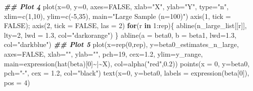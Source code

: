\documentclass[
  14pt,
]{memoir}
\newenvironment{Shaded}{\begin{snugshade}}{\end{snugshade}}
\newcommand{\AttributeTok}[1]{\textcolor[rgb]{0.77,0.63,0.00}{#1}}
\newcommand{\ConstantTok}[1]{\textcolor[rgb]{0.00,0.00,0.00}{#1}}
\newcommand{\ControlFlowTok}[1]{\textcolor[rgb]{0.13,0.29,0.53}{\textbf{#1}}}
\newcommand{\DecValTok}[1]{\textcolor[rgb]{0.00,0.00,0.81}{#1}}
\newcommand{\DocumentationTok}[1]{\textcolor[rgb]{0.56,0.35,0.01}{\textbf{\textit{#1}}}}
\newcommand{\FloatTok}[1]{\textcolor[rgb]{0.00,0.00,0.81}{#1}}
\newcommand{\FunctionTok}[1]{\textcolor[rgb]{0.00,0.00,0.00}{#1}}
\newcommand{\NormalTok}[1]{#1}
\newcommand{\SpecialCharTok}[1]{\textcolor[rgb]{0.00,0.00,0.00}{#1}}
\newcommand{\StringTok}[1]{\textcolor[rgb]{0.31,0.60,0.02}{#1}}
\begin{document}
\begin{Shaded}
\begin{Highlighting}[]
\DocumentationTok{\#\# Plot 4}
\FunctionTok{plot}\NormalTok{(}\AttributeTok{x=}\DecValTok{0}\NormalTok{, }\AttributeTok{y=}\DecValTok{0}\NormalTok{, }\AttributeTok{axes=}\ConstantTok{FALSE}\NormalTok{, }\AttributeTok{xlab=}\StringTok{"X"}\NormalTok{, }\AttributeTok{ylab=}\StringTok{"Y"}\NormalTok{, }\AttributeTok{type=}\StringTok{"n"}\NormalTok{,}
     \AttributeTok{xlim=}\FunctionTok{c}\NormalTok{(}\DecValTok{1}\NormalTok{,}\DecValTok{10}\NormalTok{), }\AttributeTok{ylim=}\FunctionTok{c}\NormalTok{(}\SpecialCharTok{{-}}\DecValTok{5}\NormalTok{,}\DecValTok{35}\NormalTok{), }\AttributeTok{main=}\StringTok{"Large Sample (n=100)"}\NormalTok{)}
\FunctionTok{axis}\NormalTok{(}\DecValTok{1}\NormalTok{, }\AttributeTok{tick =} \ConstantTok{FALSE}\NormalTok{); }\FunctionTok{axis}\NormalTok{(}\DecValTok{2}\NormalTok{, }\AttributeTok{tick =} \ConstantTok{FALSE}\NormalTok{, }\AttributeTok{las =} \DecValTok{2}\NormalTok{)}
\ControlFlowTok{for}\NormalTok{(r }\ControlFlowTok{in} \DecValTok{1}\SpecialCharTok{:}\NormalTok{rep)\{}
\FunctionTok{abline}\NormalTok{(n\_large\_list[[r]], }\AttributeTok{lty=}\DecValTok{2}\NormalTok{, }\AttributeTok{lwd =} \FloatTok{1.3}\NormalTok{, }\AttributeTok{col=}\StringTok{"darkorange"}\NormalTok{)}
\NormalTok{\}}
\FunctionTok{abline}\NormalTok{(}\AttributeTok{a =}\NormalTok{ beta0, }\AttributeTok{b =}\NormalTok{ beta1, }\AttributeTok{lwd=}\FloatTok{1.3}\NormalTok{, }\AttributeTok{col=}\StringTok{"darkblue"}\NormalTok{)}
\DocumentationTok{\#\# Plot 5}
\FunctionTok{plot}\NormalTok{(}\AttributeTok{x=}\FunctionTok{rep}\NormalTok{(}\DecValTok{0}\NormalTok{,rep), }\AttributeTok{y=}\NormalTok{beta0\_estimates\_n\_large, }\AttributeTok{axes=}\ConstantTok{FALSE}\NormalTok{, }
     \AttributeTok{xlab=}\StringTok{""}\NormalTok{, }\AttributeTok{ylab=}\StringTok{""}\NormalTok{, }\AttributeTok{pch=}\DecValTok{19}\NormalTok{, }\AttributeTok{cex=}\FloatTok{1.2}\NormalTok{, }\AttributeTok{ylim=}\NormalTok{y\_range,}
  \AttributeTok{main=}\FunctionTok{expression}\NormalTok{(}\FunctionTok{hat}\NormalTok{(beta)[}\DecValTok{0}\NormalTok{]}\SpecialCharTok{\textasciitilde{}}\StringTok{\textquotesingle{}|\textquotesingle{}}\SpecialCharTok{\textasciitilde{}}\NormalTok{X), }\AttributeTok{col=}\FunctionTok{alpha}\NormalTok{(}\StringTok{"red"}\NormalTok{,}\FloatTok{0.2}\NormalTok{))}
\FunctionTok{points}\NormalTok{(}\AttributeTok{x =} \DecValTok{0}\NormalTok{, }\AttributeTok{y=}\NormalTok{beta0, }\AttributeTok{pch=}\StringTok{"{-}"}\NormalTok{, }\AttributeTok{cex =} \FloatTok{1.2}\NormalTok{, }\AttributeTok{col=}\StringTok{"black"}\NormalTok{)}
\FunctionTok{text}\NormalTok{(}\AttributeTok{x=}\DecValTok{0}\NormalTok{, }\AttributeTok{y=}\NormalTok{beta0, }\AttributeTok{labels =} \FunctionTok{expression}\NormalTok{(beta[}\DecValTok{0}\NormalTok{]), }\AttributeTok{pos =} \DecValTok{4}\NormalTok{)}

\end{Highlighting}
\end{Shaded}
\end{document}
